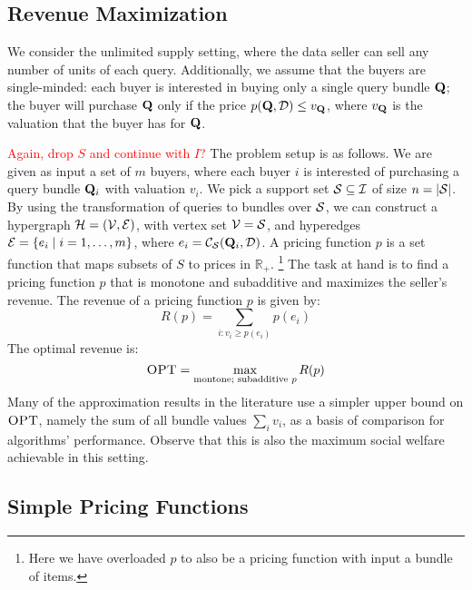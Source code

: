 \subsection{Revenue Maximization}

We consider the unlimited supply setting, where the data seller can sell any number of units of each query. 
Additionally, we assume that the buyers are single-minded: each buyer is interested in buying only a single query bundle $\mathbf{Q}$; the buyer will purchase $\mathbf{Q}$ only if the price $p(\mathbf{Q}, \mathcal{D}) \leq v_{\mathbf{Q}}$, where $v_{\mathbf{Q}}$ is the valuation  that the buyer has for $\mathbf{Q}$. 

\textcolor{red}{Again, drop $S$ and continue with $I$?}
The problem setup is as follows. We are given as input a set of $m$ buyers, where each buyer $i$ is interested of purchasing a query bundle $\mathbf{Q}_i$ with valuation $v_i$. We pick a support set $\mathcal{S} \subseteq \mathcal{I}$ of size $n = |\mathcal{S}|$. By using the transformation of queries to bundles over $\mathcal{S}$, we can construct a hypergraph $\mathcal{H} = (\mathcal{V},\mathcal{E})$, with vertex set $\mathcal{V} = \mathcal{S}$, and hyperedges $\mathcal{E} = \{{e_i}\mid{i =1, \dots, m}\}$, where $e_i ={\mathcal{C}}_{\mathcal{S}}(\mathbf{Q}_i, \mathcal{D})$. A pricing function $p$ is a set function that maps subsets of $S$ to prices in $\mathbb{R}_+$. \footnote{Here we have overloaded $p$ to also be a pricing function with input a bundle of items.} The task at hand is to find a pricing function $p$ that is monotone and subadditive and maximizes the seller's revenue. The revenue of a pricing function $p$ is given by:
\[R(p) = \sum_{i: v_i\ge p(e_i)} p(e_i)\]
The optimal revenue is:
\[\textsc{OPT} = \max_{\text{montone; subadditive } p} R(p)\]
Many of the approximation results in the literature use a simpler upper bound on $\textsc{OPT}$, namely the sum of all bundle values $\sum_i v_i$, as a basis of comparison for algorithms' performance. Observe that this is also the maximum social welfare achievable in this setting.

\subsection{Simple Pricing Functions}


